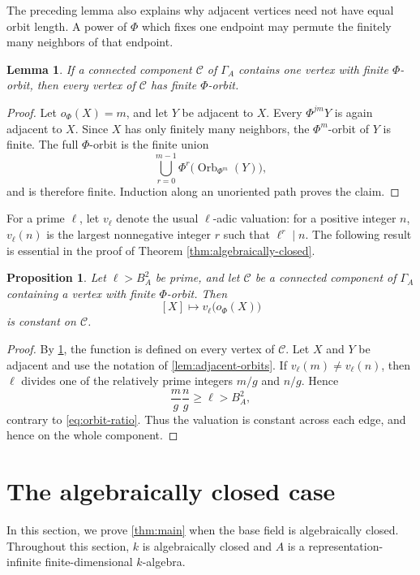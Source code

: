 \documentclass[11pt,letterpaper,reqno]{amsart}
\newtheorem{lemma}[lemma]{Lemma}
\newtheorem{proposition}[proposition]{Proposition}
\theoremstyle{definition}
\begin{document}
The preceding lemma also explains why adjacent vertices need not have equal
orbit length.  A power of $\Phi$ which fixes one endpoint may permute the
finitely many neighbors of that endpoint.

\begin{lemma}\label{lem:finite-orbits-propagate}
If a connected component $\mathcal C$ of $\Gamma_A$ contains one vertex
with finite $\Phi$-orbit, then every vertex of $\mathcal C$ has finite
$\Phi$-orbit.
\end{lemma}

\begin{proof}
Let $o_\Phi(X)=m$, and let $Y$ be adjacent to $X$.  Every
$\Phi^{jm}Y$ is again adjacent to $X$.  Since $X$ has only finitely many
neighbors, the $\Phi^m$-orbit of $Y$ is finite.  The full $\Phi$-orbit is
the finite union
\[
\bigcup_{r=0}^{m-1}
\Phi^r\bigl(\operatorname{Orb}_{\Phi^m}(Y)\bigr),
\]
and is therefore finite.  Induction along an unoriented path proves the
claim.
\end{proof}

For a prime $\ell$, let $v_\ell$ denote the usual $\ell$-adic valuation:
for a positive integer $n$, $v_\ell(n)$ is the largest nonnegative integer
$r$ such that $\ell^r\mid n$.
The following result is essential in the proof of Theorem \ref{thm:algebraically-closed}.
\begin{proposition}\label{prop:component-valuation}
Let $\ell>B_A^2$ be prime, and let $\mathcal C$ be a connected component of
$\Gamma_A$ containing a vertex with finite $\Phi$-orbit.  Then
\[
[X]\longmapsto v_\ell\bigl(o_\Phi(X)\bigr)
\]
is constant on $\mathcal C$.
\end{proposition}

\begin{proof}
By \cref{lem:finite-orbits-propagate}, the function is defined on every
vertex of $\mathcal C$.  Let $X$ and $Y$ be adjacent and use the notation of
\cref{lem:adjacent-orbits}.  If $v_\ell(m)\neq v_\ell(n)$, then $\ell$
divides one of the relatively prime integers $m/g$ and $n/g$.  Hence
\[
\frac{m}{g}\frac{n}{g}\geq\ell>B_A^2,
\]
contrary to \eqref{eq:orbit-ratio}.  Thus the valuation is constant across
each edge, and hence on the whole component.
\end{proof}

\section{The algebraically closed case}\label{sec:algebraically-closed}
In this section, we prove \cref{thm:main} when the base field is algebraically closed.
Throughout this section, $k$ is algebraically closed and $A$ is a
representation-infinite finite-dimensional $k$-algebra. 
\end{document}
